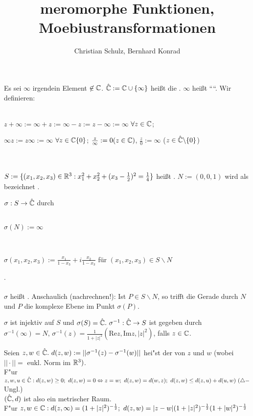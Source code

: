 \documentclass{article}
\title{meromorphe Funktionen, Moebiustransformationen}
\author{Christian Schulz, Bernhard Konrad} %
\begin{document}
\maketitle
\begin{definition}
Es sei $\infty$ irgendein Element $\not \in \mathbb{C}$. $\hat{\mathbb{C}} := \mathbb{C} \cup \{ \infty
\}$ heißt die . $\infty$ heißt ````. Wir definieren: \\ \\
\centerline{$z + \infty := \infty + z := \infty -z := z - \infty := \infty$
$\forall z \in \mathbb{C}$;} \centerline{$\infty z := z \infty := \infty$ $\forall z \in \mathbb{C}
\{0\}$; $\frac{z}{\infty} := 0 (z \in \mathbb{C})$, $\frac{z}{0}:= \infty$ ($ z \in
\hat{\mathbb{C}} \backslash \{0\} $)}\\ \\
$S := \{ (x_1, x_2, x_3) \in \mathbb{R}^3: x_1^2+ x_2^2 + (x_3 - \frac{1}{2})^2 =
\frac{1}{4}\}$ heißt . $N := (0,0,1)$ wird als
 bezeichnet .
\end{definition}
\begin{definition}
$\sigma: S \to \hat{\mathbb{C}}$ durch \\ \\
\centerline{$\sigma(N) := \infty$} \\
\centerline{$\sigma(x_1, x_2, x_3) := \frac{x_1}{1-x_3} + i \frac{x_2}{1-x_3}$ für
$(x_1,x_2,x_3) \in S \backslash N$}. \\ \\
$\sigma$ heißt . Anschaulich
(nachrechnen!): Ist $P \in S \backslash N$, so trifft die Gerade durch $N$ und $P$
die komplexe Ebene im Punkt $\sigma(P)$.
\end{definition}

\begin{satz}
$\sigma$ ist injektiv auf $S$ und $\sigma(S) = \hat{\mathbb{C}}.\ \sigma^{-1}:
\hat{\mathbb{C}} \to S$ ist gegeben durch \\ $\sigma^{-1}(\infty) = N$, $\sigma^{-1}(z) =
\frac{1}{1+ |z|^2}(\text{Re} z, \text{Im} z, |z|^2)$, falls $z \in \mathbb{C}$.
\end{satz}
%
%
%

\begin{satz}
Seien $z,w \in \hat{\mathbb{C}}.\ d(z,w):= || \sigma^{-1}(z) - \sigma^{-1}(w) ||$ hei"st der  von $z$ und $w$ (wobei $||\cdot| |=$ eukl. Norm im $\mathbb{R}^3)$.\\
F"ur $z,w,u \in \hat{\MdC}: d(z,w) \geq 0;\ d(z,w)=0 \Leftrightarrow z=w;\ d(z,w)=d(w,z);\ d(z,w) \leq d(z,u) + d(u,w)\ (\triangle-$Ungl.)\\
$(\hat{\mathbb{C}},d)$ ist also ein metrischer Raum.\\
F"ur $z,w \in \mathbb{C}: d(z,\infty) = (1+|z|^2)^{-\frac12};\ d(z,w) = |z-w|(1+|z|^2)^{-\frac12}(1+|w|^2)^{-\frac12}$
\end{satz}
\end{document}
